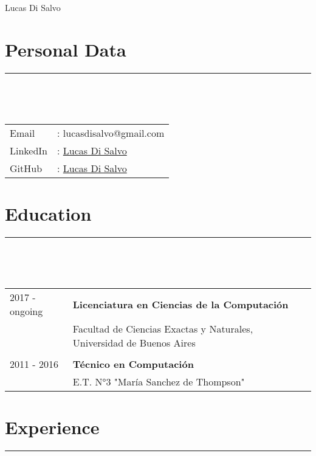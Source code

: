 \documentclass{article}
\begin{document}
\pagestyle{empty}

\par{\centering
		{\huge Lucas Di Salvo}
	\bigskip\par}

\section*{Personal Data} 
\hrule
\

\

\begin{tabular}{l l}
     Email & :  lucasdisalvo@gmail.com \\
     LinkedIn & : \href{https://www.linkedin.com/in/lucas-di-salvo-6578b915a}{Lucas Di Salvo} \\
     GitHub & : \href{https://github.com/lucasDS-0}{Lucas Di Salvo}
\end{tabular}


\section*{Education} 
\hrule
\

\

\begin{tabular}{l l}
    2017 - ongoing  & \textbf{Licenciatura en Ciencias de la Computación}\\
                    & Facultad de Ciencias Exactas y Naturales, Universidad de Buenos Aires \\ \\
    2011 - 2016 & \textbf{Técnico en Computación} \\
                & E.T. N°3 "María Sanchez de Thompson"
\end{tabular}

\section*{Experience} 
\hrule
\

\
\end{document}
